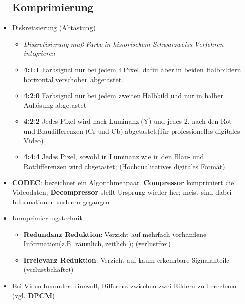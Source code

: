 \documentclass[12pt,landscape]{article}
\begin{document}
\begin{multicols}{3}
\begin{itemize}
\subsection{Komprimierung}
\item Diskretisierung (Abtastung)
\begin{itemize}
    \item \textit{Diskretisierung muß Farbe in historischem Schwarzweiss-Verfahren integrieren}
    \item \textbf{4:1:1} Farbsignal nur bei jedem 4.Pixel, dafür aber in beiden Halbbildern horizontal verschoben abgetastet.
    \item \textbf{4:2:0} Farbsignal nur bei jedem zweiten Halbbild und nur in halber Auflösung abgetastet
    \item \textbf{4:2:2} Jedes Pixel wird nach Luminanz (Y) und jedes 2. nach den Rot- und Blaudifferenzen (Cr und Cb) abgetastet.(für professionelles digitales Video)
    \item \textbf{4:4:4} Jedes Pixel, sowohl in Luminanz wie in den Blau- und Rotdifferenzen wird abgetastet; (Hochqualitatives digitales Format)
\end{itemize}
\item \textbf{CODEC}: bezeichnet ein Algorithmenpaar: \textbf{Compressor} komprimiert die Videodaten; \textbf{Decompressor} stellt Ursprung wieder her; meist sind dabei Informationen verloren gegangen
\item Komprimierungstechnik: 
\begin{itemize}
    \item \textbf{Redundanz Reduktion}: Verzicht auf mehrfach vorhandene Information(z.B. räumlich, zeitlich ); (verlustfrei)
    \item \textbf{Irrelevanz Reduktion}: Verzicht auf kaum erkennbare Signalanteile (verlustbehaftet)
\end{itemize}
\item Bei Video besonders sinnvoll, Differenz zwischen zwei Bildern zu berechnen (vgl. \textbf{DPCM})

\end{itemize}
\end{multicols}
\end{document}
